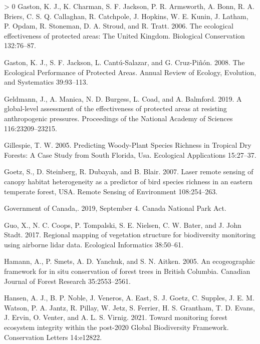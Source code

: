 \documentclass[10pt,oneside]{article}
\newlength{\cslhangindent}
\newenvironment{CSLReferences}[3] %
 {%
  \setlength{\parindent}{0pt}
  \ifodd #1 \everypar{\setlength{\hangindent}{\cslhangindent}}\ignorespaces\fi
  \ifnum #2 > 0
  \setlength{\parskip}{#2\baselineskip}
  \fi
 }%
 {}
\begin{document}
\begin{CSLReferences}{1}{0}
\leavevmode\hypertarget{ref-gastonEcologicalEffectivenessProtected2006}{}%
Gaston, K. J., K. Charman, S. F. Jackson, P. R. Armsworth, A. Bonn, R.
A. Briers, C. S. Q. Callaghan, R. Catchpole, J. Hopkins, W. E. Kunin, J.
Latham, P. Opdam, R. Stoneman, D. A. Stroud, and R. Tratt. 2006. The
ecological effectiveness of protected areas: The United Kingdom.
Biological Conservation 132:76--87.

\leavevmode\hypertarget{ref-gastonEcologicalPerformanceProtected2008}{}%
Gaston, K. J., S. F. Jackson, L. Cantú-Salazar, and G. Cruz-Piñón. 2008.
The Ecological Performance of Protected Areas. Annual Review of Ecology,
Evolution, and Systematics 39:93--113.

\leavevmode\hypertarget{ref-geldmannGloballevelAssessmentEffectiveness2019}{}%
Geldmann, J., A. Manica, N. D. Burgess, L. Coad, and A. Balmford. 2019.
A global-level assessment of the effectiveness of protected areas at
resisting anthropogenic pressures. Proceedings of the National Academy
of Sciences 116:23209--23215.

\leavevmode\hypertarget{ref-gillespie2005}{}%
Gillespie, T. W. 2005. Predicting Woody-Plant Species Richness in
Tropical Dry Forests: A Case Study from South Florida, Usa. Ecological
Applications 15:27--37.

\leavevmode\hypertarget{ref-goetz2007}{}%
Goetz, S., D. Steinberg, R. Dubayah, and B. Blair. 2007. Laser remote
sensing of canopy habitat heterogeneity as a predictor of bird species
richness in an eastern temperate forest, USA. Remote Sensing of
Environment 108:254--263.

\leavevmode\hypertarget{ref-governmentofcanada2019}{}%
Government of Canada,. 2019, September 4. Canada National Park Act.

\leavevmode\hypertarget{ref-guo2017}{}%
Guo, X., N. C. Coops, P. Tompalski, S. E. Nielsen, C. W. Bater, and J.
John Stadt. 2017. Regional mapping of vegetation structure for
biodiversity monitoring using airborne lidar data. Ecological
Informatics 38:50--61.

\leavevmode\hypertarget{ref-hamann2005}{}%
Hamann, A., P. Smets, A. D. Yanchuk, and S. N. Aitken. 2005. An
ecogeographic framework for in situ conservation of forest trees in
British Columbia. Canadian Journal of Forest Research 35:2553--2561.

\leavevmode\hypertarget{ref-hansenMonitoringForestEcosystem2021}{}%
Hansen, A. J., B. P. Noble, J. Veneros, A. East, S. J. Goetz, C.
Supples, J. E. M. Watson, P. A. Jantz, R. Pillay, W. Jetz, S. Ferrier,
H. S. Grantham, T. D. Evans, J. Ervin, O. Venter, and A. L. S. Virnig.
2021. Toward monitoring forest ecosystem integrity within the post-2020
Global Biodiversity Framework. Conservation Letters 14:e12822.


\end{CSLReferences}
\end{document}
